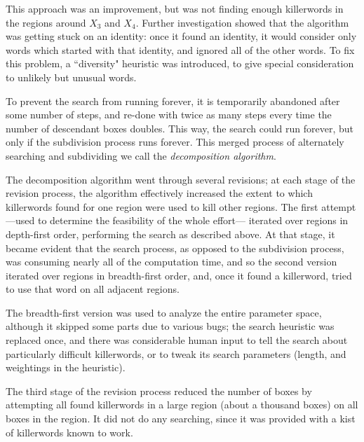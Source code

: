 This approach was an improvement, but was not finding enough killerwords in the regions
around $X_3$ and $X_4$.  Further investigation showed that the
algorithm was getting stuck on an identity: once it found an identity,
it would consider only words which started with that identity, and
ignored all of the other words.  To fix this problem, a ``diversity"
heuristic was introduced, to give special consideration to unlikely but
unusual words.

To prevent the search from running forever, it is
temporarily abandoned after some number of steps, and re-done
with twice as many steps every time the number of descendant boxes
doubles.  This way, the search could run forever, but only if
the subdivision process runs forever.
This merged process of alternately searching and subdividing we
call the {\it decomposition algorithm}.

The decomposition algorithm went through several revisions; at each stage
of the revision process,
the algorithm effectively increased the extent to which killerwords
found for one region were used to kill other regions.  The first
attempt---used to determine the feasibility of the whole effort---
iterated over regions in depth-first order, performing the search as
described above.
At that stage, it became evident that the search process, as
opposed to the subdivision process,
was consuming nearly all of the computation time, and so the second
version iterated over regions in breadth-first order, and, once it
found a killerword, tried to use that word on all adjacent regions.

The breadth-first version was used to analyze the entire parameter
space, although it skipped some parts due to various bugs; the search
heuristic was replaced once, and there was considerable human input
to tell the search about particularly difficult killerwords, or to tweak
its search parameters (length, and weightings in the heuristic).

The third stage of the revision process reduced the number of boxes
by attempting all found killerwords in a large region (about a thousand boxes)
on all boxes in the region.
It did not  do any searching,
since it was provided with a kist of killerwords known to work.

